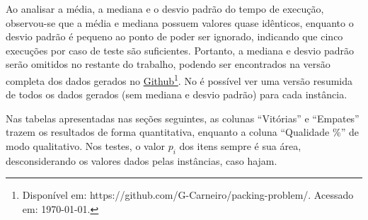 

Ao analisar a média, a mediana e o desvio padrão do tempo de execução, observou-se que a média
e mediana possuem valores quase idênticos, enquanto o desvio padrão é pequeno ao ponto de poder
ser ignorado, indicando que cinco execuções por caso de teste são suficientes.
Portanto, a mediana e desvio padrão serão omitidos no restante do trabalho, podendo ser encontrados
na versão completa dos dados gerados no \href{https://github.com/G-Carneiro/packing-problem/}{
    Github}\footnote{Disponível em: https://github.com/G-Carneiro/packing-problem/. Acessado em: \today.}.
No  é possível ver uma versão resumida de todos os dados gerados
(sem mediana e desvio padrão) para cada instância.

Nas tabelas apresentadas nas seções seguintes, as colunas “Vitórias” e “Empates” trazem os
resultados de forma quantitativa, enquanto a coluna “Qualidade \%” de modo qualitativo.
Nos testes, o valor $p_i$ dos itens sempre é sua área, desconsiderando os valores dados pelas
instâncias, caso hajam.







